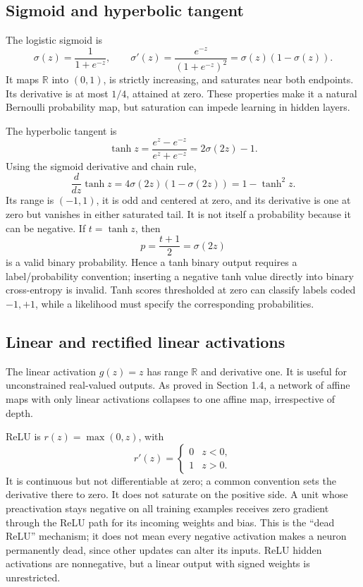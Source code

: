 \subsection{Sigmoid and hyperbolic tangent}
The logistic sigmoid is
\[
 \sigma(z)=\frac1{1+e^{-z}},\qquad
 \sigma'(z)=\frac{e^{-z}}{(1+e^{-z})^2}=\sigma(z)(1-\sigma(z)).
\]
It maps $\mathbb{R}$ into $(0,1)$, is strictly increasing, and saturates near both endpoints. Its derivative is at most $1/4$, attained at zero. These properties make it a natural Bernoulli probability map, but saturation can impede learning in hidden layers.

The hyperbolic tangent is
\[
 \tanh z=\frac{e^z-e^{-z}}{e^z+e^{-z}}=2\sigma(2z)-1.
\]
Using the sigmoid derivative and chain rule,
\[
 \frac{d}{dz}\tanh z=4\sigma(2z)(1-\sigma(2z))=1-\tanh^2z.
\]
Its range is $(-1,1)$, it is odd and centered at zero, and its derivative is one at zero but vanishes in either saturated tail. It is not itself a probability because it can be negative. If $t=\tanh z$, then
\[
 p=\frac{t+1}{2}=\sigma(2z)
\]
is a valid binary probability. Hence a tanh binary output requires a label/probability convention; inserting a negative tanh value directly into binary cross-entropy is invalid. Tanh scores thresholded at zero can classify labels coded $-1,+1$, while a likelihood must specify the corresponding probabilities.

\subsection{Linear and rectified linear activations}
The linear activation $g(z)=z$ has range $\mathbb{R}$ and derivative one. It is useful for unconstrained real-valued outputs. As proved in Section 1.4, a network of affine maps with only linear activations collapses to one affine map, irrespective of depth.

ReLU is $r(z)=\max(0,z)$, with
\[
 r'(z)=\begin{cases}0&z<0,\\1&z>0.\end{cases}
\]
It is continuous but not differentiable at zero; a common convention sets the derivative there to zero. It does not saturate on the positive side. A unit whose preactivation stays negative on all training examples receives zero gradient through the ReLU path for its incoming weights and bias. This is the ``dead ReLU'' mechanism; it does not mean every negative activation makes a neuron permanently dead, since other updates can alter its inputs. ReLU hidden activations are nonnegative, but a linear output with signed weights is unrestricted.

